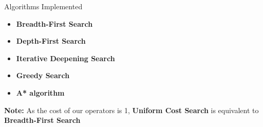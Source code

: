 

\begin{frame}{Algorithms Implemented}
    \begin{itemize}
        \item \textbf{Breadth-First Search}
        \item \textbf{Depth-First Search}
        \item \textbf{Iterative Deepening Search}
        \item \textbf{Greedy Search}
        \item \textbf{A* algorithm}
    
    \end{itemize}
    
    \textbf{Note:} As the cost of our operators is 1, \textbf{Uniform Cost Search} is equivalent to \textbf{Breadth-First Search}
    
\end{frame}
